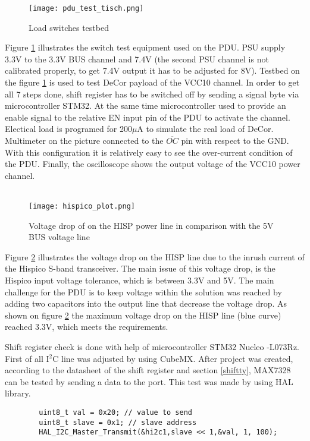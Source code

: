  \begin{figure}[h]
 	\centering
 	\texttt{[image: pdu\_test\_tisch.png]}
 	\caption{Load switches testbed}
 	\label{fig: pdu_test_tisch}
 \end{figure}

Figure \ref{fig: pdu_test_tisch} illustrates the switch test equipment used on the PDU. PSU supply 3.3V to the 3.3V BUS channel and 7.4V (the second PSU channel is not calibrated properly, to get 7.4V output it has to be adjusted for 8V). Testbed on the figure \ref{fig: pdu_test_tisch} is used to test DeCor payload of the VCC10 channel. In order to get all 7 steps done, shift register has to be switched off by sending a signal byte via microcontroller STM32. At the same time microcontroller used to provide an enable signal to the relative EN input pin of the PDU to activate the channel. Electical load is programed for 200$\mu$A to simulate the real load of DeCor. Multimeter on the picture connected to the $\overline{OC}$ pin with respect to the GND. With this configuration it is relatively easy to see the over-current condition of the PDU. Finally, the oscilloscope shows the output voltage of the VCC10 power channel.\\ \\


 \begin{figure}[h]
 	\centering
 	\texttt{[image: hispico\_plot.png]}
 	\caption{Voltage drop of on the HISP power line in comparison with the 5V BUS voltage line}
 	\label{fig: oscilloscope}
 \end{figure}

Figure \ref{fig: oscilloscope} illustrates the voltage drop on the HISP line due to the inrush current of the Hispico S-band transceiver. The main issue of this voltage drop, is the Hispico input voltage tolerance, which is between 3.3V and 5V. The main challenge for the PDU is to keep voltage within the solution was reached by adding two capacitors into the output line that decrease the voltage drop. As shown on figure \ref{fig: oscilloscope} the maximum voltage drop on the HISP line (blue curve) reached 3.3V, which meets the requirements.

	
		
		Shift register check is done with help of microcontroller STM32 Nucleo -L073Rz. First of all I$^2$C line was adjusted by using CubeMX. After project was created, according to the datasheet of the shift register and section \ref{shiftty}, MAX7328 can be tested by sending a data to the port. This test was made by using HAL library.\\
		\begin{lstlisting}
		uint8_t val = 0x20; // value to send
		uint8_t slave = 0x1; // slave address
		HAL_I2C_Master_Transmit(&hi2c1,slave << 1,&val, 1, 100);
		\end{lstlisting}
	
